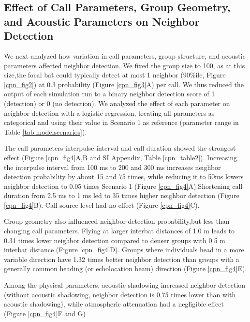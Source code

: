\documentclass[
]{book}
\begin{document}
\hypertarget{effect-of-call-parameters-group-geometry-and-acoustic-parameters-on-neighbor-detection}{%
\subsection{Effect of Call Parameters, Group Geometry, and Acoustic Parameters on Neighbor Detection}\label{effect-of-call-parameters-group-geometry-and-acoustic-parameters-on-neighbor-detection}}

We next analyzed how variation in call parameters, group structure, and acoustic parameters affected neighbor detection. We fixed the group size to 100, as at this size,the focal bat could typically detect at most 1 neighbor (90\%ile, Figure \ref{cpn_fig2}) at 0.3 probability (Figure \ref{cpn_fig3}A) per call. We thus reduced the output of each simulation run to a binary neighbor detection score of 1 (detection) or 0 (no detection). We analyzed the effect of each parameter on neighbor detection with a logistic regression, treating all parameters as categorical and using their value in Scenario 1 as reference (parameter range in Table \ref{tab:modelscenarios}).

The call parameters interpulse interval and call duration showed the strongest effect (Figure \ref{cpn_fig4}A,B and SI Appendix, Table \ref{cpn_table2}). Increasing the interpulse interval from 100 ms to 200 and 300 ms increases neighbor detection probability by about 15 and 75 times, while reducing it to 50ms lowers neighbor detection to 0.05 times Scenario 1 (Figure \ref{cpn_fig4}A).Shortening call duration from 2.5 ms to 1 ms led to 35 times higher neighbor detection (Figure \ref{cpn_fig4}B). Call source level had no effect (Figure \ref{cpn_fig4}C).

Group geometry also influenced neighbor detection probability,but less than changing call parameters. Flying at larger interbat distances of 1.0 m leads to 0.31 times lower neighbor detection compared to denser groups with 0.5 m interbat distance (Figure \ref{cpn_fig4}D). Groups where individuals head in a more variable direction have 1.32 times better neighbor detection than groups with a generally common heading (or echolocation beam) direction (Figure \ref{cpn_fig4}E).

Among the physical parameters, acoustic shadowing increased neighbor detection (without acoustic shadowing, neighbor detection is 0.75 times lower than with acoustic shadowing), while atmospheric attenuation had a negligible effect (Figure \ref{cpn_fig4}F and G)
\end{document}
